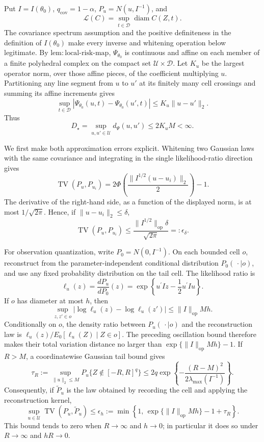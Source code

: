 Put \(I=I(\theta_0)\), \(q_{\mathrm{cov}}=1-\alpha\), \(P_u=N(u,I^{-1})\), and
\[
\mathcal L(C)=\sup_{t\in\mathcal D}\operatorname{diam}C(Z,t).
\]
The covariance spectrum assumption and the positive definiteness in the definition of \(I(\theta_0)\) make every inverse and whitening operation below legitimate.  By \(\mathrm{lem:local\mbox{-}risk\mbox{-}map}\), \(\Psi_{\theta_0}\) is continuous and affine on each member of a finite polyhedral complex on the compact set \(\mathcal U\times\mathcal D\).  Let \(K_u\) be the largest operator norm, over those affine pieces, of the coefficient multiplying \(u\).  Partitioning any line segment from \(u\) to \(u'\) at its finitely many cell crossings and summing its affine increments gives
\[
\sup_{t\in\mathcal D}
\left|\Psi_{\theta_0}(u,t)-\Psi_{\theta_0}(u',t)\right|
\le K_u\lVert u-u'\rVert_2.
\]
Thus
\[
D_\star=\sup_{u,u'\in\mathcal U}d_\Psi(u,u')
\le 2K_uM<\infty.
\]

We first make both approximation errors explicit.  Whitening two Gaussian laws with the same covariance and integrating in the single likelihood-ratio direction gives
\[
\operatorname{TV}(P_u,P_{u_i})
=2\Phi\!\left(\frac{\lVert I^{1/2}(u-u_i)\rVert_2}{2}\right)-1.
\]
The derivative of the right-hand side, as a function of the displayed norm, is at most \(1/\sqrt{2\pi}\).  Hence, if \(\lVert u-u_i\rVert_2\le\delta\),
\[
\operatorname{TV}(P_u,P_{u_i})
\le \frac{\lVert I^{1/2}\rVert_{\mathrm{op}}\delta}{\sqrt{2\pi}}
=:\epsilon_\delta.
\]

For observation quantization, write \(P_0=N(0,I^{-1})\).  On each bounded cell \(o\), reconstruct from the parameter-independent conditional distribution \(P_0(\,\cdot\mid o)\), and use any fixed probability distribution on the tail cell.  The likelihood ratio is
\[
\ell_u(z)=\frac{dP_u}{dP_0}(z)
=\exp\!\left\{u^{\prime}Iz-\frac12u^{\prime}Iu\right\}.
\]
If \(o\) has diameter at most \(h\), then
\[
\sup_{z,z'\in o}
\left|\log\ell_u(z)-\log\ell_u(z')\right|
\le \lVert I\rVert_{\mathrm{op}}Mh.
\]
Conditionally on \(o\), the density ratio between \(P_u(\,\cdot\mid o)\) and the reconstruction law is \(\ell_u(z)/E_0[\ell_u(Z)\mid Z\in o]\).  The preceding oscillation bound therefore makes their total variation distance no larger than
\(\exp\{\lVert I\rVert_{\mathrm{op}}Mh\}-1\).  If \(R>M\), a coordinatewise Gaussian tail bound gives
\[
\tau_R:=\sup_{\lVert u\rVert_2\le M}
P_u\{Z\notin[-R,R]^q\}
\le 2q\exp\!\left\{
-\frac{(R-M)^2}{2\lambda_{\max}(I^{-1})}
\right\}.
\]
Consequently, if \(\widetilde P_u\) is the law obtained by recording the cell and applying the reconstruction kernel,
\[
\sup_{u\in\mathcal U}\operatorname{TV}(P_u,\widetilde P_u)
\le
\epsilon_h:=
\min\!\left\{1,\,
\exp\{\lVert I\rVert_{\mathrm{op}}Mh\}-1+\tau_R
\right\}.
\]
This bound tends to zero when \(R\to\infty\) and \(h\to0\); in particular it does so under \(R\to\infty\) and \(hR\to0\).

